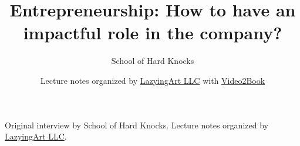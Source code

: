 \documentclass[11pt,oneside]{book}
\begin{document}
\frontmatter
\title{Entrepreneurship: How to have an impactful role in the company?}
\author{School of Hard Knocks}
\date{Lecture notes organized by \href{https://lazying.art}{LazyingArt LLC} with \href{https://github.com/lachlanchen/Video2Book}{Video2Book}}
\maketitle
\begin{center}
\small Original interview by School of Hard Knocks. Lecture notes organized by \href{https://lazying.art}{LazyingArt LLC}.
\end{center}
\clearpage
\mainmatter

\end{document}

